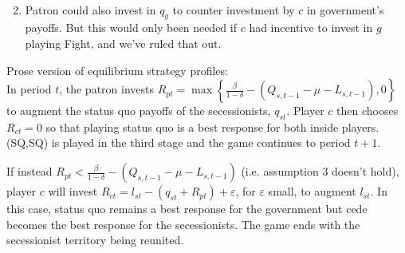 \documentclass[12pt]{article}
\newcommand{\ve}{\varepsilon}
\newcommand{\de}{\delta}
\begin{document}
\begin{enumerate}
\begin{itemize}
\begin{itemize}
\begin{multline}
						\end{multline}
				\end{itemize}
		\end{itemize}
	\item Patron could also invest in $q_g$ to counter investment by $c$ in government's payoffs. But this would only been needed if $c$ had incentive to invest in $g$ playing Fight, and we've ruled that out.
\end{enumerate}


\newpage
Prose version of equilibrium strategy profiles: \\

In period $t$, the patron invests $R_{pt} = \max\left\{\frac{\beta}{1-\de} - \left( Q_{s,t-1} - \mu - L_{s,t-1}\right),0\right\}$ to augment the status quo payoffs of the secessionists, $q_{st}$. Player $c$ then chooses $R_{ct} =0$ so that playing status quo is a best response for both inside players. (SQ,SQ) is played in the third stage and the game continues to period $t+1$.

If instead $R_{pt} < \frac{\beta}{1-\de} - \left( Q_{s,t-1} - \mu - L_{s,t-1}\right)$ (i.e. assumption 3 doesn't hold), player $c$ will invest $R_{ct} = l_{st} - \left(q_{st} + R_{pt} \right) + \ve$, for $\ve$ small, to augment $l_{st}$. In this case, status quo remains a best response for the government but cede becomes the best response for the secessionists. The game ends with the secessionist territory being reunited.
\end{document}

